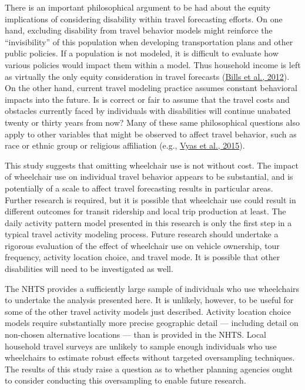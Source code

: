 \documentclass[3p, authoryear, review]{elsarticle} %
\begin{document}
There is an important philosophical argument to be had about the equity
implications of considering disability within travel forecasting efforts. On
one hand, excluding disability from travel behavior models might reinforce the
``invisibility'' of this population when developing transportation plans and other
public policies. If a population is not modeled, it is difficult to evaluate how
various policies would impact them within a model. Thus household income is left
as virtually the only equity consideration in travel forecasts (\protect\hyperlink{ref-bills2012}{Bills et al., 2012}).
On the other hand, current
travel modeling practice assumes constant behavioral impacts into the future. Is
is correct or fair to assume that the travel costs and obstacles currently
faced by individuals with disabilities will continue unabated twenty or thirty
years from now? Many of these same philosophical questions also apply to
other variables that might be observed to affect travel behavior, such as race
or ethnic group or religious affiliation (e.g., \protect\hyperlink{ref-vyas2015}{Vyas et al., 2015}).

This study suggests that omitting wheelchair use is not without cost.
The impact of wheelchair use on individual travel behavior appears to be
substantial, and is potentially of a scale to affect travel forecasting results
in particular areas. Further research is required, but it is possible that wheelchair
use could result in different outcomes for transit ridership and local trip
production at least. The daily activity pattern model presented in this research
is only the first step in a typical travel activity modeling process. Future
research should undertake a rigorous evaluation of the effect of wheelchair use
on vehicle ownership, tour frequency, activity location choice, and travel mode.
It is possible that other disabilities will need to be investigated as well.

The NHTS provides a sufficiently large sample of individuals who use wheelchairs
to undertake the analysis presented here. It is unlikely, however, to be useful
for some of the other travel activity models just described. Activity location
choice models require substantially more precise geographic detail --- including
detail on non-chosen alternative locations --- than is provided in the NHTS.
Local household travel surveys are unlikely to sample enough individuals who use
wheelchairs to estimate robust effects without targeted oversampling techniques.
The results of this study raise a question as to whether planning agencies
ought to consider conducting this oversampling to enable future research.
\end{document}

